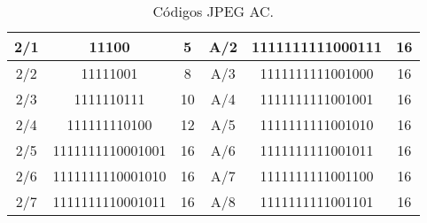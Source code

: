 \begin{table}[!ht]
\begin{tabular}{|c|c|c|c|c|c|}
2/1                                                        & 11100            & 5       & A/2                                                        & 1111111111000111 & 16      \\ \hline
2/2                                                        & 11111001         & 8       & A/3                                                        & 1111111111001000 & 16      \\ \hline
2/3                                                        & 1111110111       & 10      & A/4                                                        & 1111111111001001 & 16      \\ \hline
2/4                                                        & 111111110100     & 12      & A/5                                                        & 1111111111001010 & 16      \\ \hline
2/5                                                        & 1111111110001001 & 16      & A/6                                                        & 1111111111001011 & 16      \\ \hline
2/6                                                        & 1111111110001010 & 16      & A/7                                                        & 1111111111001100 & 16      \\ \hline
2/7                                                        & 1111111110001011 & 16      & A/8                                                        & 1111111111001101 & 16      \\ \hline
\end{tabular}
\caption{Códigos JPEG AC.}
\label{Cod-AC1}
\end{table}


